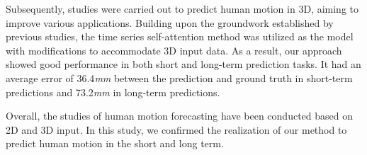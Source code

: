 \begin{abstracts}
Subsequently, studies were carried out to predict human motion in 3D, aiming to improve various applications. Building upon the groundwork established by previous studies, the time series self-attention method was utilized as the model with modifications to accommodate 3D input data. As a result, our approach showed good performance in both short and long-term prediction tasks. It had an average error of 36.4\textit{mm} between the prediction and ground truth in short-term predictions and 73.2\textit{mm} in long-term predictions.

Overall, the studies of human motion forecasting have been conducted based on 2D and 3D input. In this study, we confirmed the realization of our method to predict human motion in the short and long term.

\end{abstracts}


